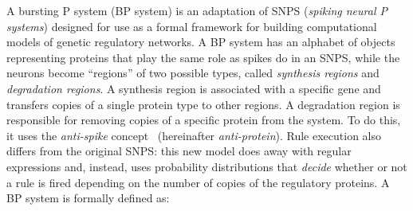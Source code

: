 \documentclass[runningheads,a4paper]{llncs}
\begin{document}
  \color{gray}
  A bursting P system (BP system) is an adaptation of SNPS (\emph{spiking
    neural P systems}) designed for use as a formal framework for building
  computational models of genetic regulatory networks. A BP system has an
  alphabet of objects representing proteins that play the same role as spikes
  do in an SNPS, while the neurons become “regions” of two possible types,
  called \emph{synthesis regions} and \emph{degradation regions}. A synthesis
  region is associated with a specific gene and transfers copies of a single
  protein type to other regions. A degradation region is responsible for
  removing copies of a specific protein from the system. To do this, it uses
  the \emph{anti-spike} concept~\cite{Pan2009} (hereinafter
  \emph{anti-protein}). Rule execution also differs from the original SNPS:
  this new model does away with regular expressions and, instead, uses
  probability distributions that \emph{decide} whether or not a rule is fired
  depending on the number of copies of the regulatory proteins. A BP system is
  formally defined as:
\end{document}

